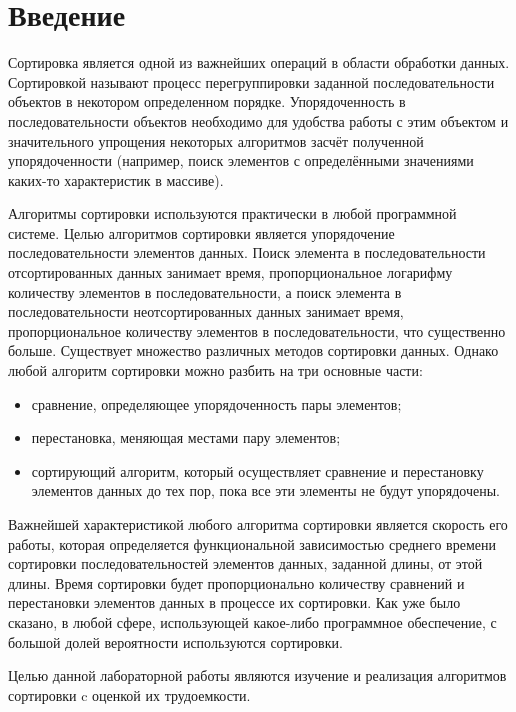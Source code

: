 \chapter*{Введение}

Сортировка является одной из важнейших операций в области обработки данных\cite{knut}. Сортировкой называют процесс перегруппировки заданной последовательности объектов в некотором определенном порядке. Упорядоченность в последовательности объектов необходимо для удобства работы с этим объектом и значительного упрощения некоторых алгоритмов засчёт полученной упорядоченности (например, поиск элементов с определёнными значениями каких-то характеристик в массиве).

Алгоритмы сортировки используются практически в любой программной системе. Целью алгоритмов сортировки является упорядочение последовательности элементов данных. Поиск элемента в последовательности отсортированных данных занимает время, пропорциональное логарифму количеству элементов в последовательности, а поиск элемента в последовательности неотсортированных данных занимает время, пропорциональное количеству элементов в последовательности, что существенно больше. Существует множество различных методов сортировки данных. Однако любой алгоритм сортировки можно разбить на три основные части:

\begin{itemize}
	\item сравнение, определяющее упорядоченность пары элементов;
	\item перестановка, меняющая местами пару элементов;
	\item сортирующий алгоритм, который осуществляет сравнение и перестановку элементов данных до тех пор, пока все эти элементы не будут упорядочены.
\end{itemize}

Важнейшей характеристикой любого алгоритма сортировки является скорость его работы, которая определяется функциональной зависимостью среднего времени сортировки последовательностей элементов данных, заданной длины, от этой длины. Время сортировки будет пропорционально количеству сравнений и перестановки элементов данных в процессе их сортировки. Как уже было сказано, в любой сфере, использующей какое-либо программное обеспечение, с большой долей вероятности используются сортировки.  

Целью данной лабораторной работы являются изучение и реализация алгоритмов сортировки c оценкой их трудоемкости.

